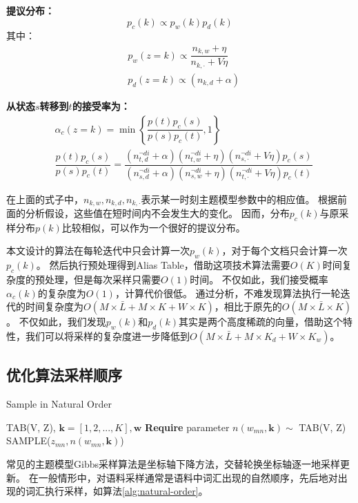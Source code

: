 \textbf{提议分布：}
\begin{equation}
 p_c(k) \propto p_w(k) p_d(k)
\end{equation}
其中：
\begin{equation}
\begin{aligned}
& p_w(z = k) \propto \dfrac{n_{k,w} +\eta}{n_{k, \cdot} + V \eta} \\
& p_d(z = k) \propto (n_{k,d} +\alpha) 
\end{aligned}
\end{equation}

\textbf{从状态$s$转移到$t$的接受率为：}
\begin{equation}
\begin{aligned}
& \alpha_c(z=k) = \min \left\{\dfrac{p(t) p_c(s)}{p(s)p_c(t)}, 1\right\} \\
& \dfrac{p(t) p_c(s)}{p(s)p_c(t)}= \dfrac{ (n_{t,d}^{\neg di} + \alpha)(n_{t,w}^{\neg di} + \eta) (n_{s,\cdot}^{\neg di} + V \eta) p_c(s)}
{ (n_{s,d}^{\neg di} + \alpha)(n_{s,w}^{\neg di} + \eta) (n_{t,\cdot}^{\neg di} + V \eta)p_c(t)}
\end{aligned}
\end{equation}

在上面的式子中，$n_{k,w}, n_{k, d}, n_{k, \cdot}$表示某一时刻主题模型参数中的相应值。
根据前面的分析假设，这些值在短时间内不会发生大的变化。
因而，分布$p_c(k)$与原采样分布$p(k)$比较相似，可以作为一个很好的提议分布。

本文设计的算法在每轮迭代中只会计算一次$p_w(k)$，对于每个文档只会计算一次$p_c(k)$。
然后执行预处理得到Alias Table，借助这项技术算法需要$O(K)$时间复杂度的预处理，但是每次采样只需要$O(1)$时间。
不仅如此，我们接受概率$\alpha_c(k)$的复杂度为$O(1)$，计算代价很低。
通过分析，不难发现算法执行一轮迭代的时间复杂度为$O(M \times \bar{L} + M \times K + W \times K)$，相比于原先的$O(M \times \bar{L} \times K)$。
不仅如此，我们发现$p_w(k)$和$p_d(k)$其实是两个高度稀疏的向量，借助这个特性，我们可以将采样的复杂度进一步降低到$O(M \times \bar{L} + M \times K_d + W \times K_w)$。


\subsection{优化算法采样顺序}

\begin{algorithm}[htb]
\label{alg:natural-order}
\caption{Sample in Natural Order}
\begin{algorithmic}[1] 
\Require TAB(V, Z), $\mathbf{k} = [1, 2, ..., K], \mathbf{w}$
\State \textbf{Require} parameter $n(w_{mn}, \mathbf{k}) \sim$ TAB(V, Z)
\State SAMPLE($z_{mn}, n(w_{mn}, \mathbf{k})$)
\EndFor
\EndFor
\end{algorithmic}  
\end{algorithm}  
常见的主题模型Gibbs采样算法是坐标轴下降方法，交替轮换坐标轴逐一地采样更新。
在一般情形中，对语料采样通常是语料中词汇出现的自然顺序，先后地对出现的词汇执行采样，如算法\ref{alg:natural-order}。

